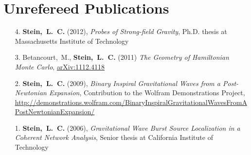 \section{\sc Unrefereed Publications}
\begin{enumerate}
\item[{4.}] {\bf Stein,~L.~C.} (2012), {\it Probes of Strong-field Gravity}, Ph.D. thesis at Massachusetts Institute of Technology
\item[{3.}] Betancourt,~M., {\bf Stein,~L.~C.} (2011) {\it The
    Geometry of Hamiltonian Monte Carlo}, \href{http://arxiv.org/abs/1112.4118}{arXiv:1112.4118}
\item[{2.}] {\bf Stein,~L.~C.} (2009), {\it Binary Inspiral
    Gravitational Waves from a Post-Newtonian Expansion}, Contribution
  to the Wolfram Demonstrations Project, \url{http://demonstrations.wolfram.com/BinaryInspiralGravitationalWavesFromAPostNewtonianExpansion/}
\item[{1.}] {\bf Stein,~L.~C.} (2006), {\it Gravitational Wave Burst Source Localization in a Coherent Network Analysis}, Senior thesis at California Institute of Technology
\end{enumerate}


